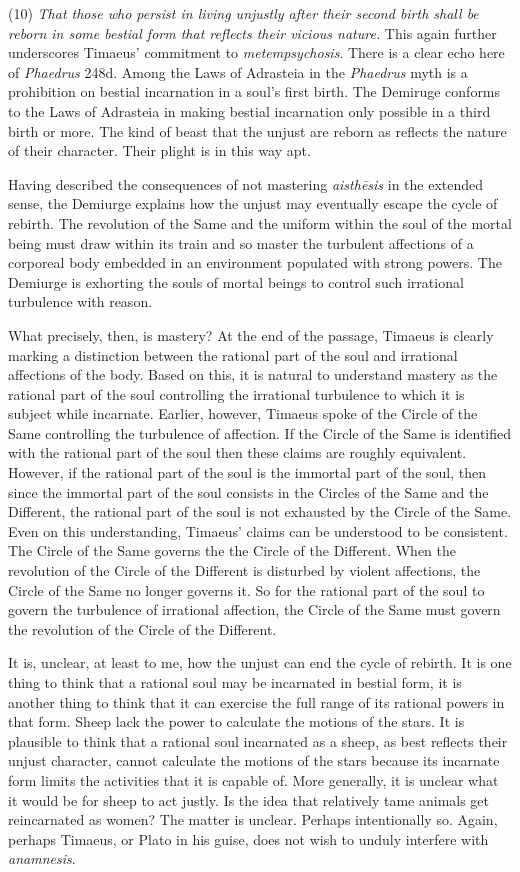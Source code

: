 (10) \emph{That those who persist in living unjustly after their second birth shall be reborn in some bestial form that reflects their vicious nature.} This again further underscores Timaeus' commitment to \emph{metempsychosis}. There is a clear echo here of \emph{Phaedrus} 248d. Among the Laws of Adrasteia in the \emph{Phaedrus} myth is a prohibition on bestial incarnation in a soul's first birth. The Demiruge conforms to the Laws of Adrasteia in making bestial incarnation only possible in a third birth or more. The kind of beast that the unjust are reborn as reflects the nature of their character. Their plight is in this way apt.

Having described the consequences of not mastering \emph{aisthēsis} in the extended sense, the Demiurge explains how the unjust may eventually escape the cycle of rebirth. The revolution of the Same and the uniform within the soul of the mortal being must draw within its train and so master the turbulent affections of a corporeal body embedded in an environment populated with strong powers. The Demiurge is exhorting the souls of mortal beings to control such irrational turbulence with reason. 

What precisely, then, is mastery? At the end of the passage, Timaeus is clearly marking a distinction between the rational part of the soul and irrational affections of the body. Based on this, it is natural to understand mastery as the rational part of the soul controlling the irrational turbulence to which it is subject while incarnate. Earlier, however, Timaeus spoke of the Circle of the Same controlling the turbulence of affection. If the Circle of the Same is identified with the rational part of the soul then these claims are roughly equivalent. However, if the rational part of the soul is the immortal part of the soul, then since the immortal part of the soul consists in the Circles of the Same and the Different, the rational part of the soul is not exhausted by the Circle of the Same. Even on this understanding, Timaeus' claims can be understood to be consistent. The Circle of the Same governs the the Circle of the Different. When the revolution of the Circle of the Different is disturbed by violent affections, the Circle of the Same no longer governs it. So for the rational part of the soul to govern the turbulence of irrational affection, the Circle of the Same must govern the revolution of the Circle of the Different.

It is, unclear, at least to me, how the unjust can end the cycle of rebirth. It is one thing to think that a rational soul may be incarnated in bestial form, it is another thing to think that it can exercise the full range of its rational powers in that form. Sheep lack the power to calculate the motions of the stars. It is plausible to think that a rational soul incarnated as a sheep, as best reflects their unjust character, cannot calculate the motions of the stars because its incarnate form limits the activities that it is capable of. More generally, it is unclear what it would be for sheep to act justly. Is the idea that relatively tame animals get reincarnated as women? The matter is unclear. Perhaps intentionally so. Again, perhaps Timaeus, or Plato in his guise, does not wish to unduly interfere with \emph{anamnesis}.

